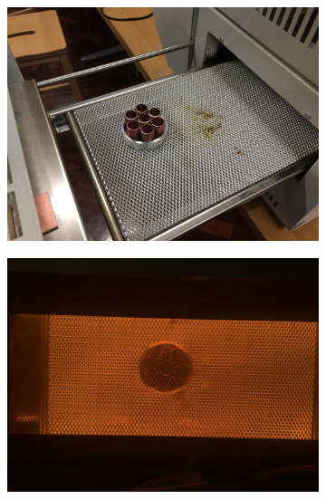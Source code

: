 \documentclass[11pt]{article}
\begin{document}
\begin{figure}[h!]
\centering
\begin{subfigure}{0.32\textwidth}
\centering
\includegraphics[width = \textwidth]{thruster_1}
\caption{}
\label{fig:thruster_1}
\end{subfigure}
\begin{subfigure}{0.32\textwidth}
\centering
\includegraphics[width = \textwidth]{thruster_2}
\caption{}
\label{fig:thruster_2}
\end{subfigure}
\begin{subfigure}{0.3\textwidth}
\centering

\end{subfigure}
\end{figure}
\end{document}
